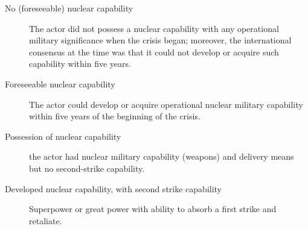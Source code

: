 \documentclass[12pt,parskip=half-]{scrartcl}
\begin{document}
\begin{description}
    \item[No (foreseeable) nuclear capability] The actor did not possess a
        nuclear capability with any operational military significance when the
        crisis began; moreover, the international consensus at the time was
        that it could not develop or acquire such capability within five years.
    \item[Foreseeable nuclear capability] The actor could develop or acquire
        operational nuclear military capability within five years of the
        beginning of the crisis.
    \item[Possession of nuclear capability] the actor had nuclear military
        capability (weapons) and delivery means but no second-strike
        capability.
    \item[Developed nuclear capability, with second strike capability]
        Superpower or great power with ability to absorb a first strike and
        retaliate.
\end{description}

\nocite{*}
\printbibliography
\end{document}
